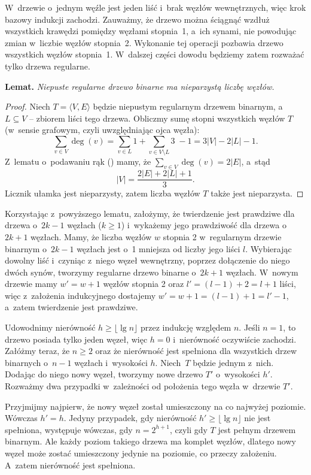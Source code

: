 \exercise %
W~drzewie o~jednym węźle jest jeden liść i~brak węzłów wewnętrznych, więc krok bazowy indukcji zachodzi. Zauważmy, że drzewo można ściągnąć wzdłuż wszystkich krawędzi pomiędzy węzłami stopnia~1, a~ich synami, nie powodując zmian w~liczbie węzłów stopnia~2. Wykonanie tej operacji pozbawia drzewo wszystkich węzłów stopnia~1. W~dalszej części dowodu będziemy zatem rozważać tylko drzewa regularne.

\medskip
\noindent\textsf{\textbf{Lemat.}} \textit{Niepuste regularne drzewo binarne ma nieparzystą liczbę węzłów.}
\begin{proof}
Niech $T=\langle V,E\rangle$ będzie niepustym regularnym drzewem binarnym, a~$L\subseteq V$ -- zbiorem liści tego drzewa. Obliczmy sumę stopni wszystkich węzłów $T$ (w~sensie grafowym, czyli uwzględniając ojca węzła):
\[
	\sum_{v\in V}\deg(v) = \sum_{v\in L}1+\sum_{v\in V\setminus L}\!\!\!3\;-1=3|V|-2|L|-1.
\]
Z~lematu o~podawaniu rąk () mamy, że $\sum_{v\in V}\deg(v) = 2|E|$, a~stąd
\[
	|V| = \frac{2|E|+2|L|+1}{3}.
\]
Licznik ułamka jest nieparzysty, zatem liczba węzłów $T$ także jest nieparzysta.
\end{proof}

Korzystając z~powyższego lematu, założymy, że twierdzenie jest prawdziwe dla drzewa o~$2k-1$ węzłach ($k\ge1$) i~wykażemy jego prawdziwość dla drzewa o~$2k+1$ węzłach. Mamy, że liczba węzłów $w$ stopnia 2 w~regularnym drzewie binarnym o~$2k-1$ węzłach jest o~1 mniejsza od liczby jego liści $l$. Wybierając dowolny liść i~czyniąc z~niego węzeł wewnętrzny, poprzez dołączenie do niego dwóch synów, tworzymy regularne drzewo binarne o~$2k+1$ węzłach. W~nowym drzewie mamy $w'=w+1$ węzłów stopnia 2 oraz $l'=(l-1)+2=l+1$ liści, więc z~założenia indukcyjnego dostajemy $w'=w+1=(l-1)+1=l'-1$, a~zatem twierdzenie jest prawdziwe.

\exercise %
Udowodnimy nierówność $h\ge\lfloor\lg n\rfloor$ przez indukcję względem $n$. Jeśli $n=1$, to drzewo posiada tylko jeden węzeł, więc $h=0$ i~nierówność oczywiście zachodzi. Załóżmy teraz, że $n\ge2$ oraz że nierówność jest spełniona dla wszystkich drzew binarnych o~$n-1$ węzłach i~wysokości $h$. Niech~$T$ będzie jednym z~nich. Dodając do niego nowy węzeł, tworzymy nowe drzewo $T'$ o~wysokości $h'$. Rozważmy dwa przypadki w~zależności od położenia tego węzła w~drzewie $T'$.

Przyjmijmy najpierw, że nowy węzeł został umieszczony na co najwyżej  poziomie. Wówczas $h'=h$. Jedyny przypadek, gdy nierówność $h'\ge\lfloor\lg n\rfloor$ nie jest spełniona, występuje wówczas, gdy $n=2^{h+1}$, czyli gdy $T$ jest pełnym drzewem binarnym. Ale każdy poziom takiego drzewa ma komplet węzłów, dlatego nowy węzeł może zostać umieszczony jedynie na  poziomie, co przeczy założeniu. A~zatem nierówność jest spełniona.

